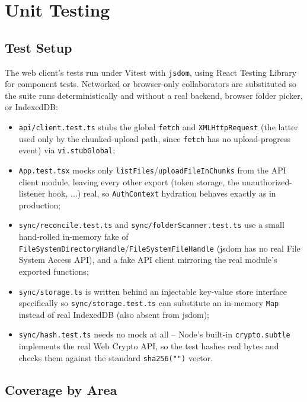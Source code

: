 \documentclass[12pt,a4paper]{article}
\begin{document}
\section{Unit Testing}
\label{sec:testing}

\subsection{Test Setup}

The web client's tests run under Vitest with \texttt{jsdom}, using React Testing Library for component tests. Networked or browser-only collaborators are substituted so the suite runs deterministically and without a real backend, browser folder picker, or IndexedDB:

\begin{itemize}[nosep]
    \item \texttt{api/client.test.ts} stubs the global \texttt{fetch} and \texttt{XMLHttpRequest} (the latter used only by the chunked-upload path, since \texttt{fetch} has no upload-progress event) via \texttt{vi.stubGlobal};
    \item \texttt{App.test.tsx} mocks only \texttt{listFiles}/\texttt{uploadFileInChunks} from the API client module, leaving every other export (token storage, the unauthorized-listener hook, ...) real, so \texttt{AuthContext} hydration behaves exactly as in production;
    \item \texttt{sync/reconcile.test.ts} and \texttt{sync/folderScanner.test.ts} use a small hand-rolled in-memory fake of \texttt{FileSystemDirectoryHandle}/\texttt{FileSystemFileHandle} (jsdom has no real File System Access API), and a fake API client mirroring the real module's exported functions;
    \item \texttt{sync/storage.ts} is written behind an injectable key-value store interface specifically so \texttt{sync/storage.test.ts} can substitute an in-memory \texttt{Map} instead of real IndexedDB (also absent from jsdom);
    \item \texttt{sync/hash.test.ts} needs no mock at all -- Node's built-in \texttt{crypto.subtle} implements the real Web Crypto API, so the test hashes real bytes and checks them against the standard \texttt{sha256("")} vector.
\end{itemize}

\subsection{Coverage by Area}
\end{document}
